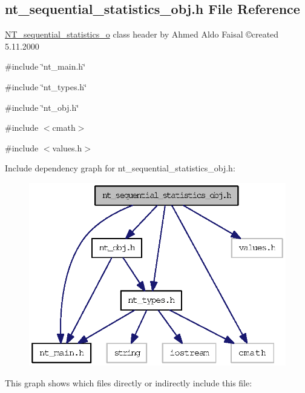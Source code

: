\subsection{nt\_\-sequential\_\-statistics\_\-obj.h File Reference}
\label{nt__sequential__statistics__obj_8h}



\begin{DoxyItemize}
\item \hyperlink{class_n_t__sequential__statistics__o}{NT\_\-sequential\_\-statistics\_\-o} class header by Ahmed Aldo Faisal \copyright created 5.11.2000 
\end{DoxyItemize} 


{\ttfamily \#include \char`\"{}nt\_\-main.h\char`\"{}}\par
{\ttfamily \#include \char`\"{}nt\_\-types.h\char`\"{}}\par
{\ttfamily \#include \char`\"{}nt\_\-obj.h\char`\"{}}\par
{\ttfamily \#include $<$cmath$>$}\par
{\ttfamily \#include $<$values.h$>$}\par
Include dependency graph for nt\_\-sequential\_\-statistics\_\-obj.h:
\nopagebreak
\begin{figure}[H]
\begin{center}
\leavevmode
\includegraphics[width=320pt]{nt__sequential__statistics__obj_8h__incl}
\end{center}
\end{figure}
This graph shows which files directly or indirectly include this file:
\nopagebreak
